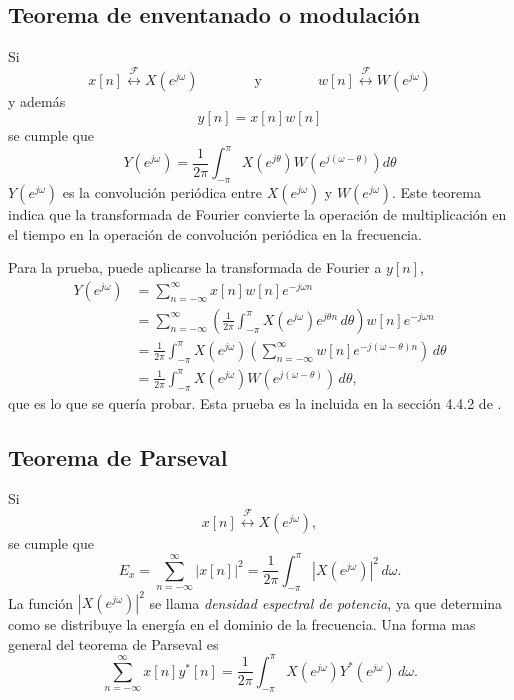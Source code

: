 \documentclass[a4paper]{report}
\begin{document}
\subsection{Teorema de enventanado o modulación}

Si
\[
 x[n]\overset{\mathcal{F}}{\longleftrightarrow}X(e^{j\omega})
 \qquad\qquad\textrm{y}\qquad\qquad
 w[n]\overset{\mathcal{F}}{\longleftrightarrow}W(e^{j\omega})
\]
y además
\[
 y[n]=x[n]w[n]
\]
se cumple que
\[
 Y(e^{j\omega})=\frac{1}{2\pi}\int_{-\pi}^{\pi}X(e^{j\theta})W(e^{j(\omega-\theta)})d\theta
\]
\(Y(e^{j\omega})\) es la convolución periódica entre \(X(e^{j\omega})\) y \(W(e^{j\omega})\). Este teorema indica que la transformada de Fourier convierte la operación de multiplicación en el tiempo en la operación de convolución periódica en la frecuencia.

Para la prueba, puede aplicarse la transformada de Fourier a \(y[n]\),
\begin{align*}
 Y(e^{j\omega})&=\sum_{n=-\infty}^\infty x[n]w[n]e^{-j\omega n}\\
   &=\sum_{n=-\infty}^\infty\left(\frac{1}{2\pi}\int_{-\pi}^\pi X(e^{j\omega})e^{j\theta n}\,d\theta\right)w[n]e^{-j\omega n}\\
   &=\frac{1}{2\pi}\int_{-\pi}^\pi X(e^{j\omega})\left(\sum_{n=-\infty}^\infty w[n]e^{-j(\omega-\theta)n}\right)\,d\theta\\
   &=\frac{1}{2\pi}\int_{-\pi}^\pi X(e^{j\omega})W(e^{j(\omega-\theta)})\,d\theta,
\end{align*}
que es lo que se quería probar. Esta prueba es la incluida en la sección 4.4.2 de \cite{proakis06digital}.

\subsection{Teorema de Parseval}

Si
\[
x[n]\overset{\mathcal{F}}{\longleftrightarrow}X(e^{j\omega}),
\]
se cumple que
\[
 E_x=\sum_{n=-\infty}^{\infty}|x[n]|^2=\frac{1}{2\pi}\int_{-\pi}^{\pi}|X(e^{j\omega})|^2\,d\omega.
\]
La función \(|X(e^{j\omega})|^2\) se llama \emph{densidad espectral de potencia}, ya que determina como se distribuye la energía en el dominio de la frecuencia. Una forma mas general del teorema de Parseval es
\begin{equation}\label{eq:seq_and_sys_parseval_theorem}
 \sum_{n=-\infty}^{\infty}x[n]y^*[n]=\frac{1}{2\pi}\int_{-\pi}^{\pi}X(e^{j\omega})Y^*(e^{j\omega})\,d\omega. 
\end{equation}
\end{document}
